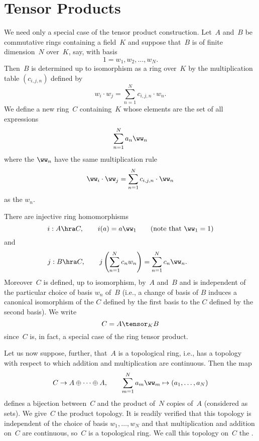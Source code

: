 \section{Tensor Products}
We need only a special case of the tensor product construction.
Let~$A$ and~$B$ be commutative rings containing a field~$K$ and suppose that~$B$ is of finite dimension~$N$ over~$K$, say, with basis 
$$
  1=w_1, w_2, \ldots, w_N.
$$
Then~$B$ is determined up to isomorphism as a ring over~$K$
by the multiplication table $(c_{i,j,n})$ defined by
$$
   w_i \cdot w_j = \sum_{n=1}^N c_{i,j,n} \cdot w_n.
$$
We define a new ring~$C$ containing~$K$ whose elements are 
the set of all expressions
$$
\sum_{n=1}^N a_n \ww_n
$$
where the $\ww_n$ have the same multiplication rule
$$
   \ww_i \cdot \ww_j = \sum_{n=1}^N c_{i,j,n} \cdot \ww_n
$$
as the $w_n$. 

There are injective ring homomorphisms
$$  
i:A\hra C, \qquad i(a) = a \ww_1  \qquad \text{(note that $\ww_1=1$)}
$$
and 
$$
j:B\hra C, \qquad j\left(\sum_{n=1}^N c_n w_n\right) = \sum_{n=1}^N c_n \ww_n.
\qquad\quad\,\,\,\,\mbox{}
$$
Moreover~$C$ is defined, up to isomorphism, by~$A$ and~$B$ and is
independent of the particular choice of basis $w_n$ of~$B$ (i.e., a
change of basis of $B$ induces a canonical isomorphism of the $C$
defined by the first basis to the $C$ defined by the second basis).
We write
$$
  C = A\tensor_K B
$$
since~$C$ is, in fact, a special case of the ring tensor product.

Let us now suppose, further, that~$A$ is a topological ring, i.e., has
a topology with respect to which addition and multiplication are
continuous.  Then the map 
$$
C\to A \oplus \cdots \oplus A,\qquad
  \sum_{m=1}^N a_m \ww_m \mapsto (a_1,\ldots, a_N)
$$
defines a bijection between~$C$ and the product of~$N$ copies of~$A$
(considered as sets). We give~$C$ the product topology.  It is readily
verified that this topology is independent of the choice of basis
$w_1, \ldots, w_N$ and that multiplication and addition on~$C$ are
continuous, so~$C$ is a topological ring.  We call this topology
on~$C$ the .

